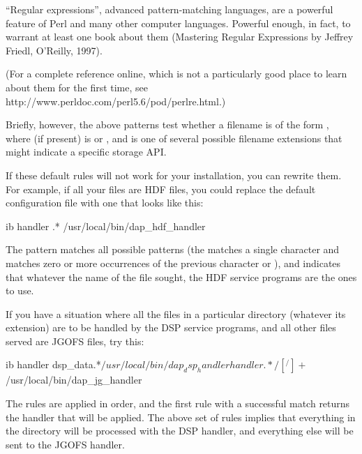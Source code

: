 \documentclass{dods-book}
\begin{document}
\begin{itemize}
``Regular expressions'', advanced pattern-matching languages, are a
powerful feature of Perl and many other computer languages. Powerful
enough, in fact, to warrant at least one book about them (Mastering
Regular Expressions by Jeffrey Friedl, O'Reilly, 1997). 

%

(For a complete reference online, which is not a particularly good
place to learn about them for the first time, see
{http://www.perldoc.com/perl5.6/pod/perlre.html}.)

Briefly, however, the above patterns test whether a filename is of the form 
, where  (if
present) is  or , and  is one of several
possible filename extensions that might indicate a specific storage
API.

If these default rules will not work for your installation, you can
rewrite them.  For example, if all your files are HDF files, you could
replace the default configuration file with one that looks like this:

\begin{vcode}{ib}
handler .* /usr/local/bin/dap_hdf_handler
\end{vcode}

The  pattern matches all possible patterns (the 
matches a single character and \lit{*} matches zero or more
occurrences of the previous character or ), and
indicates that whatever the name of the file sought, the HDF service
programs are the ones to use.

If you have a situation where all the files in a particular directory
(whatever its extension) are to be handled by the DSP service
programs, and all other files served are JGOFS files, try this:

\begin{vcode}{ib}
handler \/dsp_data\/.*$ /usr/local/bin/dap_dsp_handler %
handler .*/[^/]+$ /usr/local/bin/dap_jg_handler %
\end{vcode}

The rules are applied in order, and the first rule with a successful
match returns the handler that will be applied. The above set of rules
implies that everything in the  directory will be
processed with the DSP handler, and everything else will be sent to
the JGOFS handler.

\end{itemize}
\end{document}
